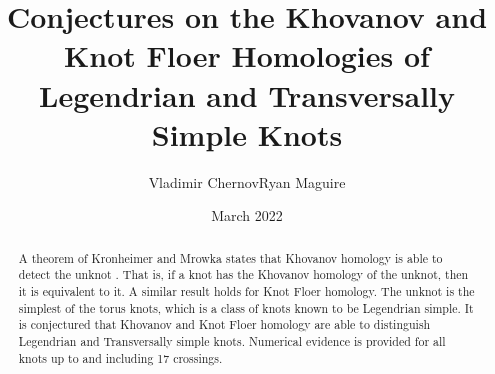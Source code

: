 \documentclass{article}
\title{Conjectures on the Khovanov and Knot Floer Homologies of
       Legendrian and Transversally Simple Knots}
\author{Vladimir Chernov\hspace{2em}Ryan Maguire}
\date{March 2022}
\theoremstyle{plain}
\begin{document}
    \maketitle
    \tableofcontents
    \begin{abstract}
        \noindent
        A theorem of Kronheimer and Mrowka states that Khovanov homology is
        able to detect the unknot \cite{kronheimermrowka2010}.
        That is, if a knot has the Khovanov homology of the unknot, then it is
        equivalent to it. A similar result holds for Knot Floer
        homology. The unknot is the simplest of the torus knots, which is a
        class of knots known to be Legendrian simple. It is conjectured that
        Khovanov and Knot Floer homology are able to distinguish Legendrian
        and Transversally simple knots. Numerical evidence is provided for
        all knots up to and including 17 crossings. 
	\end{abstract}
\end{document}
